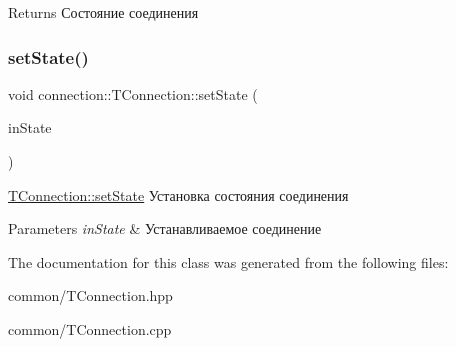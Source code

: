 \begin{DoxyReturn}{Returns}
Состояние соединения 
\end{DoxyReturn}
\mbox{\label{classconnection_1_1_t_connection_af42c1674b7be3cf7be88806df013860e}} 
\subsubsection{\texorpdfstring{set\+State()}{setState()}}
{\footnotesize\ttfamily void connection\+::\+T\+Connection\+::set\+State (\begin{DoxyParamCaption}\item[{\hyperlink{classconnection_1_1_t_connection_aee7dfb7510592bd2697ab6f906b9612c}{T\+Connection\+::state} \&}]{in\+State }\end{DoxyParamCaption})}



\hyperlink{classconnection_1_1_t_connection_af42c1674b7be3cf7be88806df013860e}{T\+Connection\+::set\+State} Установка состояния соединения 


\begin{DoxyParams}{Parameters}
{\em in\+State} & Устанавливаемое соединение \\
\hline
\end{DoxyParams}


The documentation for this class was generated from the following files\+:\begin{DoxyCompactItemize}
\item 
common/T\+Connection.\+hpp\item 
common/T\+Connection.\+cpp\end{DoxyCompactItemize}
